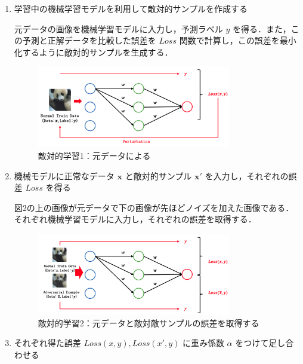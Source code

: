 \begin{enumerate}

    \item 学習中の機械学習モデルを利用して敵対的サンプルを作成する

    元データの画像を機械学習モデルに入力し，予測ラベル $y$ を得る．また，この予測と正解データを比較した誤差を $Loss$ 関数で計算し，この誤差を最小化するように敵対的サンプルを生成する．
    
    \begin{figure}[H]
        \centering
        \includegraphics[width=0.8\textwidth]{images/敵対的学習1.png}
        \caption{敵対的学習1：元データによる}
        \label{fig:adversarial_learning1}
    \end{figure}
    
    \item 機械モデルに正常なデータ $\bm{x}$ と敵対的サンプル $\bm{x}'$ を入力し，それぞれの誤差 $Loss$ を得る

    図2の上の画像が元データで下の画像が先ほどノイズを加えた画像である．それぞれ機械学習モデルに入力し，それぞれの誤差を取得する．

    \begin{figure}[H]
        \centering
        \includegraphics[width=0.8\textwidth]{images/敵対的学習2.png}
        \caption{敵対的学習2：元データと敵対敵サンプルの誤差を取得する}
        \label{fig:adversarial_learning2}
    \end{figure}

    \item それぞれ得た誤差 $Loss(x, y), Loss(x', y)$ に重み係数 $\alpha$ をつけて足し合わせる


\end{enumerate}
